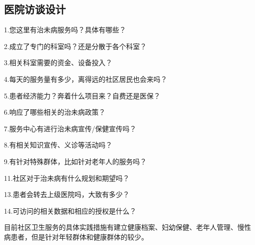 \subsection{医院访谈设计}
1.您这里有治未病服务吗？具体有哪些？

2.成立了专门的科室吗？还是分散于各个科室？

3.相关科室需要的资金、设备投入？

4.每天的服务量有多少，离得远的社区居民也会来吗？

5.患者经济能力？奔着什么项目来？自费还是医保？

6.响应了哪些相关的治未病政策？

7.服务中心有进行治未病宣传/保健宣传吗？

8.有相关知识宣传、义诊等活动吗？

9.有针对特殊群体，比如针对老年人的服务吗？

11.社区对于治未病有什么规划和期望吗？

13.患者会转去上级医院吗，大致有多少？

14.可访问的相关数据和相应的授权是什么？

目前社区卫生服务的具体实践措施有建立健康档案、妇幼保健、老年人管理、慢性病患者，但是针对年轻群体和健康群体的较少。

